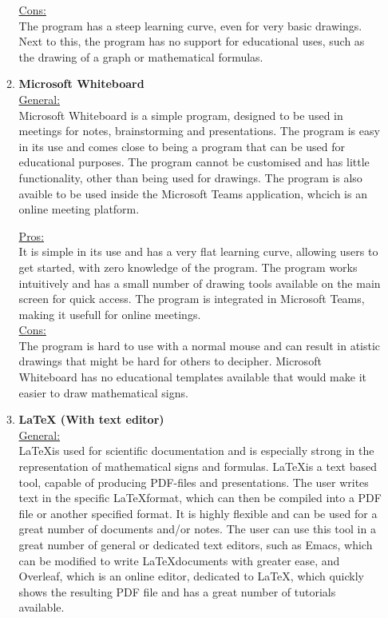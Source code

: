 \documentclass[a4paper,12pt]{article}
\begin{document}
\begin{enumerate}
\begin{enumerate}
    \underline{Cons:}\\
    The program has a steep learning curve, even for very basic drawings. Next to this, the program has no support for educational uses, such as the drawing of a graph or mathematical formulas.\\

  \item \textbf{Microsoft Whiteboard}\\
    \underline{General:}\\
    Microsoft Whiteboard is a simple program, designed to be used in meetings for notes, brainstorming and presentations. The program is easy in its use and comes close to being a program that can be used for educational purposes. The program cannot be customised and has little functionality, other than being used for drawings. The program is also avaible to be used inside the Microsoft Teams application, whcich is an online meeting platform.
    
    \underline{Pros:}\\
    It is simple in its use and has a very flat learning curve, allowing users to get started, with zero knowledge of the program. The program works intuitively and has a small number of drawing tools available on the main screen for quick access. The program is integrated in Microsoft Teams, making it usefull for online meetings.\\
    
    \underline{Cons:}\\
    The program is hard to use with a normal mouse and can result in atistic drawings that might be hard for others to decipher. Microsoft Whiteboard has no educational templates available that would make it easier to draw mathematical signs.\\

  \item \textbf{LaTeX (With text editor)}\\
    \underline{General:}\\
    \LaTeX is used for scientific documentation and is especially strong in the representation of mathematical signs and formulas. \LaTeX is a text based tool, capable of producing PDF-files and presentations. The user writes text in the specific \LaTeX format, which can then be compiled into a PDF file or another specified format. It is highly flexible and can be used for a great number of documents and/or notes. The user can use this tool in a great number of general or dedicated text editors, such as Emacs, which can be modified to write \LaTeX documents with greater ease, and Overleaf, which is an online editor, dedicated to \LaTeX, which quickly shows the resulting PDF file and has a great number of tutorials available.\\
    

\end{enumerate}
\end{enumerate}
\end{document}
